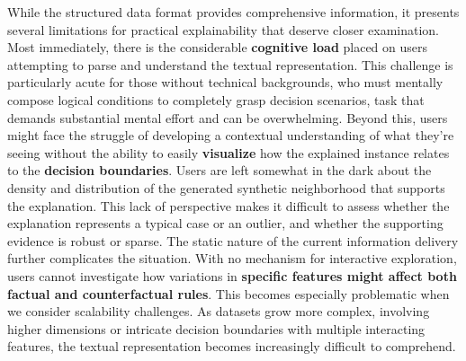 While the structured data format provides comprehensive information, it presents several limitations for practical explainability that deserve closer examination. Most immediately, there is the considerable \textbf{cognitive load} placed on users attempting to parse and understand the textual representation. This challenge is particularly acute for those without technical backgrounds, who must mentally compose logical conditions to completely grasp decision scenarios, task that demands substantial mental effort and can be overwhelming.
Beyond this, users might face the struggle of developing a contextual understanding of what they're seeing without the ability to easily \textbf{visualize} how the explained instance relates to the \textbf{decision boundaries}. Users are left somewhat in the dark about the density and distribution of the generated synthetic neighborhood that supports the explanation. This lack of perspective makes it difficult to assess whether the explanation represents a typical case or an outlier, and whether the supporting evidence is robust or sparse.
The static nature of the current information delivery further complicates the situation. With no mechanism for interactive exploration, users cannot investigate how variations in \textbf{specific features might affect both factual and counterfactual rules}. This becomes especially problematic when we consider scalability challenges. As datasets grow more complex, involving higher dimensions or intricate decision boundaries with multiple interacting features, the textual representation becomes increasingly difficult to comprehend.
